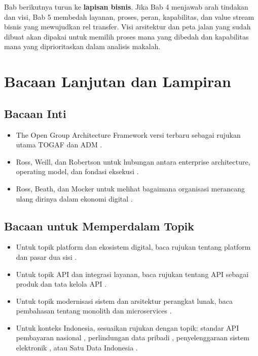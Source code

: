 Bab berikutnya turun ke \textbf{lapisan bisnis}. Jika Bab 4 menjawab arah
tindakan dan visi, Bab 5 membedah layanan, proses, peran, kapabilitas, dan value
stream bisnis yang mewujudkan rel transfer. Visi arsitektur dan peta jalan yang
sudah dibuat akan dipakai untuk memilih proses mana yang dibedah dan kapabilitas
mana yang diprioritaskan dalam analisis makalah.

\section{Bacaan Lanjutan dan Lampiran}

\subsection*{Bacaan Inti}

\begin{itemize}
  \item The Open Group Architecture Framework versi terbaru sebagai rujukan
        utama TOGAF dan ADM \cite{togaf10}.
  \item Ross, Weill, dan Robertson untuk hubungan antara enterprise
        architecture, operating model, dan fondasi eksekusi
        \cite{ross2006enterprise}.
  \item Ross, Beath, dan Mocker untuk melihat bagaimana organisasi merancang
        ulang dirinya dalam ekonomi digital \cite{ross2019designed}.
\end{itemize}

\subsection*{Bacaan untuk Memperdalam Topik}

\begin{itemize}
  \item Untuk topik platform dan ekosistem digital, baca rujukan tentang
        platform dan pasar dua sisi
        \cite{parker2016platform,cusumano2019business,evans2016matchmakers}.
  \item Untuk topik API dan integrasi layanan, baca rujukan tentang API sebagai
        produk dan tata kelola API
        \cite{jacobson2011apis,medjaoui2018continuous}.
  \item Untuk topik modernisasi sistem dan arsitektur perangkat lunak, baca
        pembahasan tentang monolith dan microservices \cite{newman2021building}.
  \item Untuk konteks Indonesia, sesuaikan rujukan dengan topik: standar API
        pembayaran nasional \cite{snapbi}, perlindungan data pribadi
        \cite{uupdp2022}, penyelenggaraan sistem elektronik \cite{pp712019},
        atau Satu Data Indonesia \cite{satudata}.
\end{itemize}

